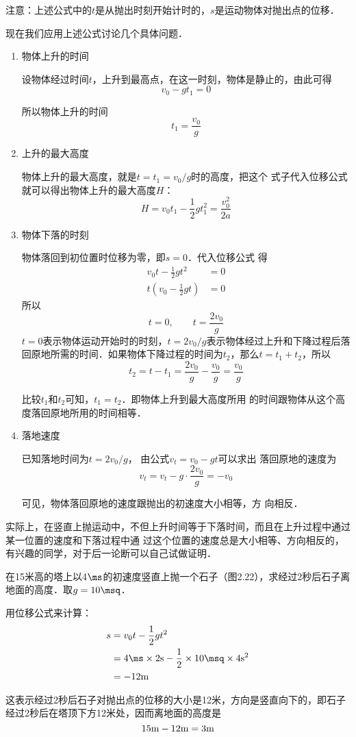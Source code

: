 注意：上述公式中的$t$是从抛出时刻开始计时的，$s$是运动物体对抛出点的位移．

现在我们应用上述公式讨论几个具体问题．
\begin{enumerate}[(1)]
	\item  物体上升的时间
	
	设物体经过时间$t$，上升到最高点，在这一时刻，物体是静止的，由此可得
	\[v_0-gt_1=0 \]
	
	所以物体上升的时间
	\[t_1=\frac{v_0}{g} \]
	
	\item 上升的最大高度
	
	物体上升的最大高度，就是$t=t_1=v_0/g$时的高度，把这个
	式子代入位移公式就可以得出物体上升的最大高度$H$：
	\[H=v_0t_1-\frac{1}{2}gt_1^2=\frac{v^2_0}{2a} \]
	
	\item 物体下落的时刻
	
	物体落回到初位置时位移为零，即$s=0$．代入位移公式
	得
	\[\begin{split}
	v_0 t-\frac{1}{2}gt^2&=0\\
	t\left(v_0-\frac{1}{2}gt\right)&=0
	\end{split} \]
	所以
	\[t=0,\qquad t=\frac{2v_0}{g} \]
	$t=0$表示物体运动开始时的时刻，$t=2v_0/g$表示物体经过上升和下降过程后落回原地所需的时间．如果物体下降过程的时间为$t_2$，那么$t=t_1+t_2$，所以
	\[t_2=t-t_1=\frac{2v_0}{g}-\frac{v_0}{g}=\frac{v_0}{g} \]
	
	比较$t_1$和$t_2$可知，$t_1=t_2$．即物体上升到最大高度所用
	的时间跟物体从这个高度落回原地所用的时间相等．
	
	\item 落地速度
	
	已知落地时间为$t=2v_0/g$，
	由公式$v_t=v_0-gt$可以求出
	落回原地的速度为
	\[v_t=v_t-g\cdot \frac{2v_0}{g}=-v_0 \]
	
	可见，物体落回原地的速度跟抛出的初速度大小相等，方
	向相反．
\end{enumerate}

实际上，在竖直上抛运动中，不但上升时间等于下落时间，而且在上升过程中通过某一位置的速度和下落过程中通
过这个位置的速度总是大小相等、方向相反的，有兴趣的同学，对于后一论断可以自己试做证明．

\begin{example}
在15米高的塔上以4$\ms$的初速度竖直上抛一个石子（图2.22），求经过2秒后石子离地面的高度．取$g=10\msq$．
\end{example}

\begin{solution}
用位移公式来计算：
\[\begin{split}
s&=v_0 t-\frac{1}{2}gt^2\\
&=4\ms \times 2{\rm s}-\frac{1}{2}\times 10\msq \times 4{\rm s^2}\\
&=-12{\rm m}
\end{split} \]

这表示经过2秒后石子对抛出点的位移的大小是12米，方向是竖直向下的，即石子经过2秒后在塔顶下方12米处，因而离地面的高度是
\[15{\rm m}-12{\rm m}=3{\rm m}\]
\end{solution}

